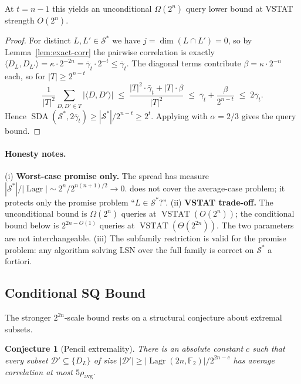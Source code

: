 \documentclass[11pt,a4paper]{article}
\theoremstyle{plain}
\newtheorem{conjecture}[theorem]{Conjecture}
\theoremstyle{definition}
\newcommand{\F}{\mathbb{F}}
\DeclareMathOperator{\Lagr}{Lagr}
\DeclareMathOperator{\SDA}{SDA}
\DeclareMathOperator{\VSTAT}{VSTAT}
\begin{document}
At $t = n-1$ this yields an unconditional $\Omega(2^n)$ query lower bound at VSTAT strength $O(2^n)$.

\begin{proof}
For distinct $L, L' \in \mathcal{S}^*$ we have $j = \dim(L \cap L') = 0$, so by Lemma~\ref{lem:exact-corr} the pairwise correlation is exactly $\langle D_L, D_{L'}\rangle = \kappa \cdot 2^{-2n} = \bar\gamma_t \cdot 2^{-t} \leq \bar\gamma_t$. The diagonal terms contribute $\beta = \kappa \cdot 2^{-n}$ each, so for $|T| \geq 2^{n-t}$
\[
\frac{1}{|T|^2}\sum_{D,D' \in T} |\langle D,D'\rangle|
\;\leq\; \frac{|T|^2 \cdot \bar\gamma_t + |T| \cdot \beta}{|T|^2}
\;\leq\; \bar\gamma_t + \frac{\beta}{2^{n-t}}
\;\leq\; 2\bar\gamma_t.
\]
Hence $\SDA(\mathcal{S}^*, 2\bar\gamma_t) \geq |\mathcal{S}^*| / 2^{n-t} \geq 2^t$. Applying  with $\alpha = 2/3$ gives the query bound.
\end{proof}

\paragraph{Honesty notes.}
(i) \textbf{Worst-case promise only.} The spread has measure $|\mathcal{S}^*|/|\Lagr| \sim 2^n / 2^{n(n+1)/2} \to 0$.  does not cover the average-case problem; it protects only the promise problem ``$L \in \mathcal{S}^*$?''.
(ii) \textbf{VSTAT trade-off.} The unconditional bound is $\Omega(2^n)$ queries at $\VSTAT(O(2^n))$; the conditional bound below is $2^{2n-O(1)}$ queries at $\VSTAT(\Theta(2^{2n}))$. The two parameters are not interchangeable.
(iii) The subfamily restriction is valid for the promise problem: any algorithm solving LSN over the full family is correct on $\mathcal{S}^*$ a fortiori.

\subsection{Conditional SQ Bound}
\label{subsec:main-sq}

The stronger $2^{2n}$-scale bound rests on a structural conjecture about extremal subsets.

\begin{conjecture}[Pencil extremality]
\label{conj:pencil}
There is an absolute constant $c$ such that every subset $\mathcal{D}' \subseteq \{D_L\}$ of size $|\mathcal{D}'| \geq |\Lagr(2n,\F_2)| / 2^{2n-c}$ has average correlation at most $5\rho_{\mathrm{avg}}$.
\end{conjecture}
\end{document}

